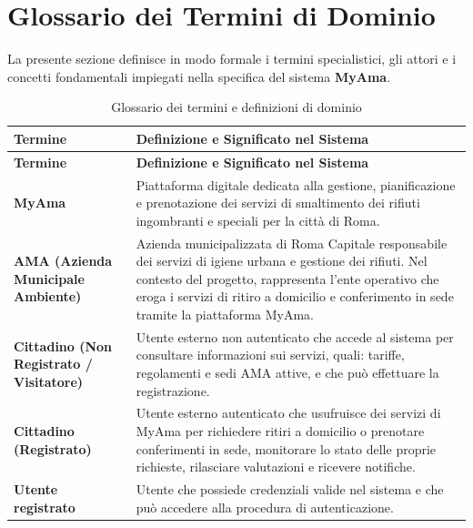 \section{Glossario dei Termini di Dominio}

La presente sezione definisce in modo formale i termini specialistici, gli attori e i concetti fondamentali impiegati nella specifica del sistema \textbf{MyAma}.

\begin{center}
\renewcommand{\arraystretch}{1.3}
\begin{longtable}{|p{4.2cm}|p{10.5cm}|}
\caption{Glossario dei termini e definizioni di dominio} \label{tab:glossario} \\ \hline
\rowcolor{tableheader} \textbf{Termine} & \textbf{Definizione e Significato nel Sistema} \\ \hline
\endfirsthead

\hline
\rowcolor{tableheader} \textbf{Termine} & \textbf{Definizione e Significato nel Sistema} \\ \hline
\endhead

\textbf{MyAma} & Piattaforma digitale dedicata alla gestione, pianificazione e prenotazione dei servizi di smaltimento dei rifiuti ingombranti e speciali per la città di Roma. \\ \hline

\textbf{AMA (Azienda Municipale Ambiente)} & Azienda municipalizzata di Roma Capitale responsabile dei servizi di igiene urbana e gestione dei rifiuti. Nel contesto del progetto, rappresenta l'ente operativo che eroga i servizi di ritiro a domicilio e conferimento in sede tramite la piattaforma MyAma. \\ \hline

\textbf{Cittadino (Non Registrato / Visitatore)} & Utente esterno non autenticato che accede al sistema per consultare informazioni sui servizi, quali: tariffe, regolamenti e sedi AMA attive, e che può effettuare la registrazione. \\ \hline

\textbf{Cittadino (Registrato)} & Utente esterno autenticato che usufruisce dei servizi di MyAma per richiedere ritiri a domicilio o prenotare conferimenti in sede, monitorare lo stato delle proprie richieste, rilasciare valutazioni e ricevere notifiche. \\ \hline

\textbf{Utente registrato} & Utente che possiede credenziali valide nel sistema e che può accedere alla procedura di autenticazione. \\ \hline


\end{longtable}
\end{center}
